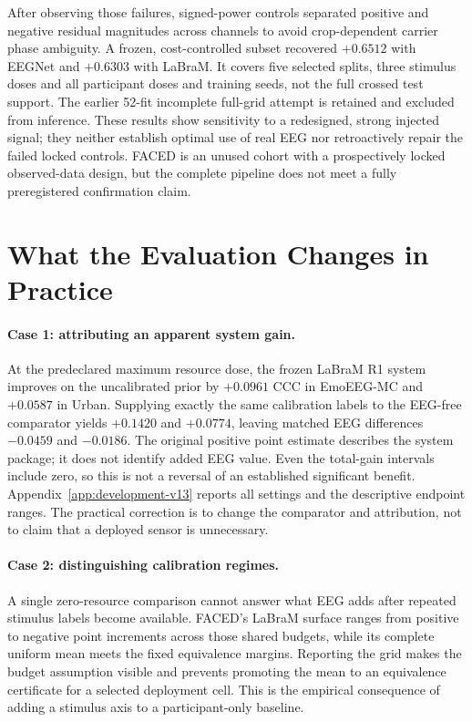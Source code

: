 After observing those failures, signed-power controls separated positive and
negative residual magnitudes across channels to avoid crop-dependent carrier
phase ambiguity. A frozen, cost-controlled subset recovered $+0.6512$ with
EEGNet and $+0.6303$ with LaBraM. It covers five selected splits, three stimulus
doses and all participant doses and training seeds, not the full crossed test
support. The earlier 52-fit incomplete full-grid attempt is retained and
excluded from inference. These results show sensitivity to a redesigned,
strong injected signal; they neither establish optimal use of real EEG nor
retroactively repair the failed locked controls. FACED is an unused cohort
with a prospectively locked observed-data design, but the complete pipeline
does not meet a fully preregistered confirmation claim.

\section{What the Evaluation Changes in Practice}
\label{sec:practical-cases}

\paragraph{Case 1: attributing an apparent system gain.}
At the predeclared maximum resource dose, the frozen LaBraM R1 system improves
on the uncalibrated prior by $+0.0961$ CCC in EmoEEG-MC and $+0.0587$ in
Urban. Supplying exactly the same calibration labels to the EEG-free
comparator yields $+0.1420$ and $+0.0774$, leaving matched EEG differences
$-0.0459$ and $-0.0186$. The original positive point estimate describes the
system package; it does not identify added EEG value. Even the total-gain
intervals include zero, so this is not a reversal of an established
significant benefit. Appendix~\ref{app:development-v13} reports all settings
and the descriptive endpoint ranges. The practical correction is to change
the comparator and attribution, not to claim that a deployed sensor is
unnecessary.

\paragraph{Case 2: distinguishing calibration regimes.}
A single zero-resource comparison cannot answer what EEG adds after repeated
stimulus labels become available. FACED's LaBraM surface ranges from positive
to negative point increments across those shared budgets, while its complete
uniform mean meets the fixed equivalence margins. Reporting the grid makes
the budget assumption visible and prevents promoting the mean to an
equivalence certificate for a selected deployment cell. This is the empirical
consequence of adding a stimulus axis to a participant-only baseline.

